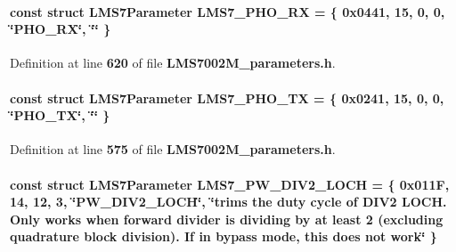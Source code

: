 \paragraph[{L\+M\+S7\+\_\+\+P\+H\+O\+\_\+\+RX}]{\setlength{\rightskip}{0pt plus 5cm}const struct {\bf L\+M\+S7\+Parameter} L\+M\+S7\+\_\+\+P\+H\+O\+\_\+\+RX = \{ 0x0441, 15, 0, 0, \char`\"{}\+P\+H\+O\+\_\+\+R\+X\char`\"{}, \char`\"{}\char`\"{} \}\hspace{0.3cm}{\ttfamily [static]}}\label{LMS7002M__parameters_8h_aa28faf932830101c95e5a338464e359e}


Definition at line {\bf 620} of file {\bf L\+M\+S7002\+M\+\_\+parameters.\+h}.

\paragraph[{L\+M\+S7\+\_\+\+P\+H\+O\+\_\+\+TX}]{\setlength{\rightskip}{0pt plus 5cm}const struct {\bf L\+M\+S7\+Parameter} L\+M\+S7\+\_\+\+P\+H\+O\+\_\+\+TX = \{ 0x0241, 15, 0, 0, \char`\"{}\+P\+H\+O\+\_\+\+T\+X\char`\"{}, \char`\"{}\char`\"{} \}\hspace{0.3cm}{\ttfamily [static]}}\label{LMS7002M__parameters_8h_a181035d2e1cc8cd37f290d3404f6f211}


Definition at line {\bf 575} of file {\bf L\+M\+S7002\+M\+\_\+parameters.\+h}.

\paragraph[{L\+M\+S7\+\_\+\+P\+W\+\_\+\+D\+I\+V2\+\_\+\+L\+O\+CH}]{\setlength{\rightskip}{0pt plus 5cm}const struct {\bf L\+M\+S7\+Parameter} L\+M\+S7\+\_\+\+P\+W\+\_\+\+D\+I\+V2\+\_\+\+L\+O\+CH = \{ 0x011\+F, 14, 12, 3, \char`\"{}\+P\+W\+\_\+\+D\+I\+V2\+\_\+\+L\+O\+C\+H\char`\"{}, \char`\"{}trims the duty cycle of D\+I\+V2 L\+O\+C\+H. Only works when forward divider is dividing by at least 2 (excluding quadrature block division). If in bypass mode, this does not work\char`\"{} \}\hspace{0.3cm}{\ttfamily [static]}}\label{LMS7002M__parameters_8h_a451b720a5fb161be4ac6f5d1ef6a6d7a}


